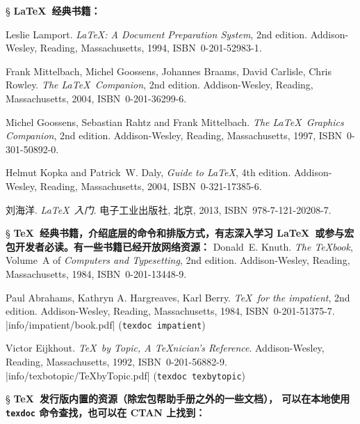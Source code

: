 \begin{thebibliography}{20}

\item[\S] {\bfseries \LaTeX\ 经典书籍：}

 Leslie Lamport. 
  \newblock \emph{\LaTeX: A Document Preparation System}, 2nd edition.
  \newblock Addison-Wesley, Reading, Massachusetts, 1994, ISBN~0-201-52983-1.

 Frank Mittelbach, Michel Goossens, Johannes Braams, David Carlisle, Chris Rowley. 
  \newblock \emph{The \LaTeX\ Companion}, 2nd edition.
  \newblock Addison-Wesley, Reading, Massachusetts, 2004, ISBN~0-201-36299-6.

 Michel Goossens, Sebastian Rahtz and Frank Mittelbach. 
  \newblock \emph{The \LaTeX\ Graphics Companion}, 2nd edition.
  \newblock Addison-Wesley, Reading, Massachusetts, 1997, ISBN~0-301-50892-0.

 Helmut Kopka and Patrick~W. Daly,
  \newblock \emph{Guide to \LaTeX}, 4th edition.
  \newblock Addison-Wesley, Reading, Massachusetts, 2004, ISBN~0-321-17385-6.

 刘海洋.
  \newblock \emph{\LaTeX\ 入门}. 
  \newblock 电子工业出版社, 北京, 2013, ISBN~978-7-121-20208-7.

\item[\S] {\bfseries \TeX\ 经典书籍，介绍底层的命令和排版方式，有志深入学习 \LaTeX\ 或参与宏包开发者必读。有一些书籍已经开放网络资源：}
 Donald~E. Knuth. 
  \newblock \emph{The \TeX book}, Volume~A of \textit{Computers and Typesetting}, 2nd edition.
  \newblock Addison-Wesley, Reading, Massachusetts, 1984, ISBN~0-201-13448-9.

 Paul Abrahams, Kathryn A. Hargreaves, Karl Berry.
  \newblock \emph{\TeX\ for the impatient}, 2nd edition.
  \newblock Addison-Wesley, Reading, Massachusetts, 1984, ISBN~0-201-51375-7. \\
  \CTAN|info/impatient/book.pdf| (\texttt{texdoc impatient})

 Victor Eijkhout. 
  \newblock \emph{\TeX\ by Topic, A \TeX nician's Reference}.
  \newblock Addison-Wesley, Reading, Massachusetts, 1992, ISBN~0-201-56882-9. \\
  \CTAN|info/texbotopic/TeXbyTopic.pdf| (\texttt{texdoc texbytopic})

\item[\S] {\bfseries \TeX\ 发行版内置的资源（除宏包帮助手册之外的一些文档），
  可以在本地使用 \texttt{texdoc} 命令查找，也可以在 CTAN 上找到：}


\end{thebibliography}
